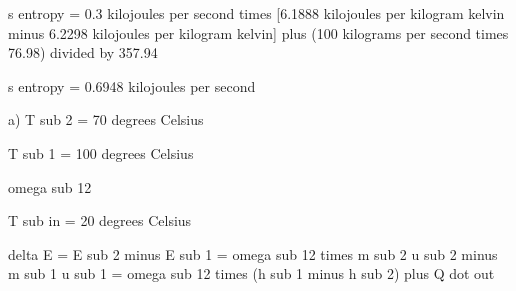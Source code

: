 s entropy = 0.3 kilojoules per second times [6.1888 kilojoules per kilogram kelvin minus 6.2298 kilojoules per kilogram kelvin] plus (100 kilograms per second times 76.98) divided by 357.94

s entropy = 0.6948 kilojoules per second

a) T sub 2 = 70 degrees Celsius

T sub 1 = 100 degrees Celsius

omega sub 12

T sub in = 20 degrees Celsius

delta E = E sub 2 minus E sub 1 = omega sub 12 times m sub 2 u sub 2 minus m sub 1 u sub 1 = omega sub 12 times (h sub 1 minus h sub 2) plus Q dot out